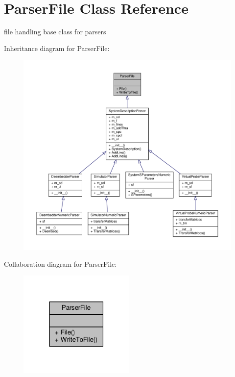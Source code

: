 \hypertarget{classSignalIntegrity_1_1Parsers_1_1ParserFile_1_1ParserFile}{}\section{Parser\+File Class Reference}
\label{classSignalIntegrity_1_1Parsers_1_1ParserFile_1_1ParserFile}


file handling base class for parsers  




Inheritance diagram for Parser\+File\+:\nopagebreak
\begin{figure}[H]
\begin{center}
\leavevmode
\includegraphics[width=350pt]{classSignalIntegrity_1_1Parsers_1_1ParserFile_1_1ParserFile__inherit__graph}
\end{center}
\end{figure}


Collaboration diagram for Parser\+File\+:\nopagebreak
\begin{figure}[H]
\begin{center}
\leavevmode
\includegraphics[width=162pt]{classSignalIntegrity_1_1Parsers_1_1ParserFile_1_1ParserFile__coll__graph}
\end{center}
\end{figure}
